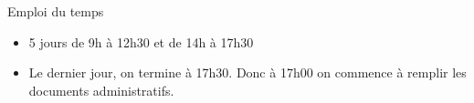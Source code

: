 \begin{frame}{Emploi du temps}
  \begin{itemize}
  \item 5 jours de 9h à 12h30 et de 14h à 17h30
  \item Le dernier jour, on termine à 17h30.
    Donc à 17h00 on commence à remplir les documents administratifs.
  \end{itemize}
\end{frame}
